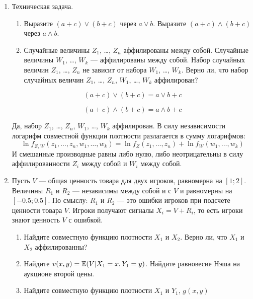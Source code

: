 \begin{enumerate}


\item Техническая задача.
\begin{enumerate}
\item Выразите $ (a+c)\vee (b+c) $ через $ a\vee b $. Выразите $ (a+c)\wedge (b+c) $ через $ a\wedge b $.
\item Случайные величины $ Z_{1} $, \ldots , $ Z_{n} $ аффилированы между собой. Случайные величины $ W_{1} $, \ldots , $ W_{k} $ — аффилированы между собой. Набор случайных величин $ Z_{1} $, \ldots , $ Z_{n} $ не зависит от набора $ W_{1} $, \ldots , $ W_{k} $. Верно ли, что набор случайных величин $ Z_{1} $, \ldots , $ Z_{n} $, $ W_{1} $, \ldots , $ W_{k} $ аффилирован?
\end{enumerate}

\begin{equation}
(a+c)\vee (b+c)=a\vee b +c
\end{equation}

\begin{equation}
(a+c)\wedge (b+c)=a\wedge b +c
\end{equation}

Да, набор $ Z_{1} $, \ldots , $ Z_{n} $, $ W_{1} $, \ldots , $ W_{k} $ аффилирован. В силу независимости логарифм совместной функции плотности разлагается в сумму логарифмов:
\begin{equation}
\ln f_{Z,W}(z_{1},\ldots ,z_{n},w_{1},\ldots ,w_{k})= \ln f_{Z}(z_{1},\ldots ,z_{n})+\ln f_{W}(w_{1},\ldots ,w_{k})
\end{equation}
И смешанные производные равны либо нулю, либо неотрицательны в силу аффилированности $ Z_{i} $ между собой и $ W_{i} $ между собой.

\item Пусть $  V $ — общая ценность товара для двух игроков, равномерна на $ [1;2] $. Величины $ R_{1} $ и $ R_{2} $ — независимы между собой и с $ V $ и равномерны на $ [-0.5;0.5] $. По смыслу: $ R_{1} $ и $ R_{2} $ — это ошибки игроков при подсчете ценности товара $ V $. Игроки получают сигналы $ X_{i}=V+R_{i} $, то есть игроки знают ценность  $ V $ с ошибкой.
\begin{enumerate}
\item Найдите совместную функцию плотности $ X_{1} $ и $ X_{2} $. Верно ли, что $ X_{1} $ и $ X_{2} $ аффилированны?
\item Найдите $ v(x,y)=\mathbb{E}(V|X_{1}=x,Y_{1}=y) $. Найдите равновесие Нэша на аукционе второй цены.
\item Найдите совместную функцию плотности $ X_{1} $ и $ Y_{1} $, $ g(x,y) $
\end{enumerate} 


\end{enumerate}
